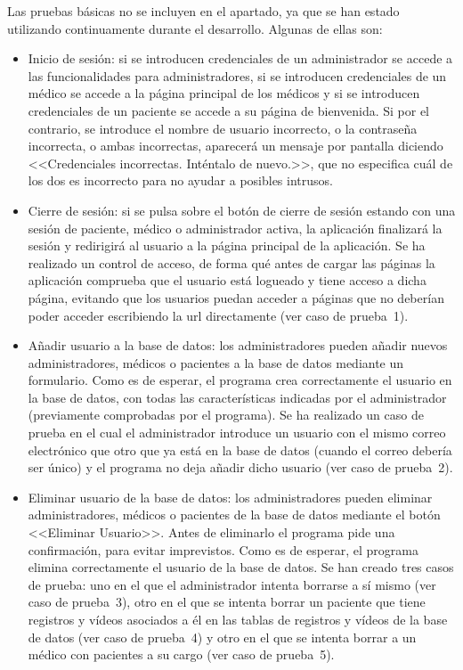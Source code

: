 Las pruebas básicas no se incluyen en el apartado, ya que se han estado utilizando continuamente durante el desarrollo. Algunas de ellas son:
\begin{itemize}
    \item Inicio de sesión: si se introducen credenciales de un administrador se accede a las funcionalidades para administradores, si se introducen credenciales de un médico se accede a la página principal de los médicos y si se introducen credenciales de un paciente se accede a su página de bienvenida. 
    Si por el contrario, se introduce el nombre de usuario incorrecto, o la contraseña incorrecta, o ambas incorrectas, aparecerá un mensaje por pantalla diciendo <<Credenciales incorrectas. Inténtalo de nuevo.>>, que no especifica cuál de los dos es incorrecto para no ayudar a posibles intrusos.
    
    \item Cierre de sesión: si se pulsa sobre el botón de cierre de sesión estando con una sesión de paciente, médico o administrador activa, la aplicación finalizará la sesión y redirigirá al usuario a la página principal de la aplicación. Se ha realizado un control de acceso, de forma qué antes de cargar las páginas la aplicación comprueba que el usuario está logueado y tiene acceso a dicha página, evitando que los usuarios puedan acceder a páginas que no deberían poder acceder escribiendo la url directamente (ver caso de prueba~1).
    
    \item Añadir usuario a la base de datos: los administradores pueden añadir nuevos administradores, médicos o pacientes a la base de datos mediante un formulario. Como es de esperar, el programa crea correctamente el usuario en la base de datos, con todas las características indicadas por el administrador (previamente comprobadas por el programa). Se ha realizado un caso de prueba en el cual el administrador introduce un usuario con el mismo correo electrónico que otro que ya está en la base de datos (cuando el correo debería ser único) y el programa no deja añadir dicho usuario (ver caso de prueba~2).
    
    \item Eliminar usuario de la base de datos: los administradores pueden eliminar administradores, médicos o pacientes de la base de datos mediante el botón <<Eliminar Usuario>>. Antes de eliminarlo el programa pide una confirmación, para evitar imprevistos. Como es de esperar, el programa elimina correctamente el usuario de la base de datos. Se han creado tres casos de prueba: uno en el que el administrador intenta borrarse a sí mismo (ver caso de prueba~3), otro en el que se intenta borrar un paciente que tiene registros y vídeos asociados a él en las tablas de registros y vídeos de la base de datos (ver caso de prueba~4) y otro en el que se intenta borrar a un médico con pacientes a su cargo (ver caso de prueba~5).


\end{itemize}

